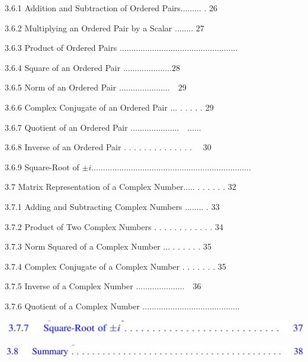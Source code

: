 \documentclass[10pt]{article}
\begin{document}
3.6.1 Addition and Subtraction of Ordered Pairs......... . 26

3.6.2 Multiplying an Ordered Pair by a Scalar ........ 27

3.6.3 Product of Ordered Pairs $\ldots \ldots \ldots \ldots \ldots \ldots \ldots \ldots \ldots \ldots \ldots \ldots \ldots \ldots \ldots \ldots \ldots$

3.6.4 Square of an Ordered Pair $\ldots \ldots \ldots \ldots \ldots \ldots \ldots 28$

3.6.5 Norm of an Ordered Pair $\ldots \ldots \ldots \ldots \ldots . \ldots \ldots \quad 29$

3.6.6 Complex Conjugate of an Ordered Pair ... . . . . . 29

3.6.7 Quotient of an Ordered Pair $\ldots \ldots \ldots \ldots \ldots \ldots \ldots \quad \ldots \ldots$

3.6.8 Inverse of an Ordered Pair . . . . . . . . . . . . . . $\quad 30$

3.6.9 Square-Root of $\pm i \ldots \ldots \ldots \ldots \ldots \ldots \ldots \ldots \ldots \ldots \ldots \ldots \ldots \ldots \ldots \ldots \ldots \ldots \ldots \ldots \ldots \ldots \ldots$

3.7 Matrix Representation of a Complex Number..... . . . . . . 32

3.7.1 Adding and Subtracting Complex Numbers ........ . 33

3.7.2 Product of Two Complex Numbers . . . . . . . . . . . . 34

3.7.3 Norm Squared of a Complex Number ... . . . . . . 35

3.7.4 Complex Conjugate of a Complex Number . . . . . . . 35

3.7.5 Inverse of a Complex Number $\ldots \ldots \ldots \ldots \ldots \ldots \ldots \quad 36$

3.7.6 Quotient of a Complex Number $\ldots \ldots \ldots \ldots \ldots \ldots \ldots \ldots \ldots \ldots \ldots \ldots \ldots \ldots$

\begin{center}
\includegraphics[max width=\textwidth]{2023_04_20_41f1ceac5a31dc7d1b59g-010(2)}
\end{center}

\begin{center}
\includegraphics[max width=\textwidth]{2023_04_20_41f1ceac5a31dc7d1b59g-010(1)}
\end{center}
\end{document}
